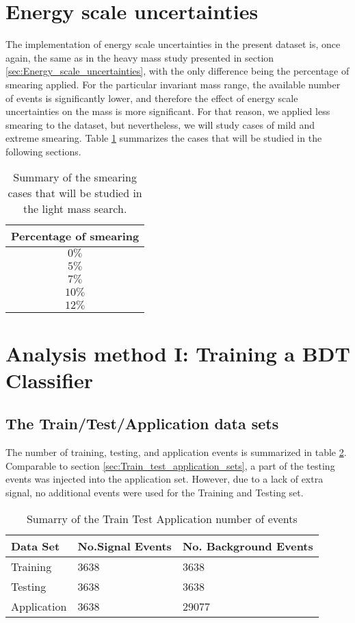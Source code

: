 \section{Energy scale uncertainties}
\label{sec:orga50049c}
\label{sec:Light_energy_scale_uncertainties}
The implementation of energy scale uncertainties in the present dataset is, once again, the same as in the heavy mass study presented in section \ref{sec:Energy_scale_uncertainties}, with the only difference being the percentage of smearing applied. For the particular invariant mass range, the available number of events is significantly lower, and therefore the effect of energy scale uncertainties on the mass is more significant. For that reason, we applied less smearing to the dataset, but nevertheless, we will study cases of mild and extreme smearing. Table \ref{table:LightSmearings} summarizes the cases that will be studied in the following sections.
\begin{table}[h!]
\centering
\begin{tabular}{ |c|  }
 \hline
Percentage of smearing \\
 \hline
$0\%$\\
$5\%$\\
$7\%$\\
$10\%$\\
$12\%$\\
\hline
\end{tabular}
\caption{Summary of the smearing cases that will be studied in the light mass search. }
\label{table:LightSmearings}
\end{table}
\section{Analysis method I: Training a BDT Classifier}
\label{sec:org6370180}
\subsection{The Train/Test/Application data sets}
\label{sec:org4e2ad68}
\label{sec:Light_train_test_application}
The number of training, testing, and application events is summarized in table \ref{table:LightTrainTestAppEvents}. Comparable to  section \ref{sec:Train_test_application_sets}, a part of the testing events was injected into the application set. However, due to a lack of extra signal, no additional events were used for the Training and Testing set.
\begin{table}[h!]
\centering
\begin{tabular}{ |p{3cm}|p{3cm}|p{4cm}|  }
 \hline
Data Set & No.Signal Events & No. Background Events \\
 \hline
Training & 3638 & 3638 \\
Testing & 3638 & 3638 \\
Application & 3638 & 29077 \\
 \hline
\end{tabular}
\caption{Sumarry of the Train Test Application number of events}
\label{table:LightTrainTestAppEvents}
\end{table}

